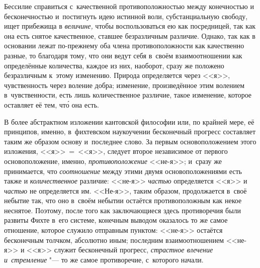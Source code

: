 Бессилие справиться с~качественной противоположностью между конечностью и
бесконечностью и~постигнуть идею истинной воли, субстанциальную свободу, ищет
прибежища в {\em величине,} чтобы воспользоваться ею как посредницей, так как
она есть снятое качественное, ставшее безразличным различие. Однако, так как
в основании лежат по-прежнему оба члена противоположности как качественно
разные, то благодаря тому, что они ведут себя в~своём взаимоотношении как
определённые количества, каждое из них, наоборот, сразу же положено
безразличным к~этому изменению. Природа определяется через <<я>>, чувственность
через воление добра; изменение, произведённое этим волением в~чувственности,
есть лишь количественное различие, такое изменение, которое оставляет её тем,
чт\'{о} она есть.

В более абстрактном изложении кантовской философии или, по крайней мере, её
принципов, именно, в~фихтевском наукоучении бесконечный прогресс составляет таким
же образом основу и~последнее слово. За первым основоположением этого
изложения, <<я>>~=~<<я>>, следует второе независимое от первого
основоположение, именно, {\em противоположение} <<не-я>>; и~сразу же
принимается, что {\em соотношение} между этими двумя основоположениями есть
также и {\em количественное} различие: <<не-я>> {\em частью} определяется <<я>>
и {\em частью} не определяется им. <<Не-я>>, таким образом, продолжается в~своё
небытие так, что оно в~своём небытии остаётся противоположным как некое
неснятое. Поэтому, после того как заключающиеся здесь противоречия были развиты
Фихте в~его системе, конечным выводом оказалось то же самое отношение, которое
служило отправным пунктом: <<не-я>> остаётся бесконечным
толчком, абсолютно иным; последним
взаимоотношением <<не-я>> и <<я>> служит бесконечный прогресс, {\em страстное
влечение и~стремление} "--- то же самое противоречие, с~которого начали.

